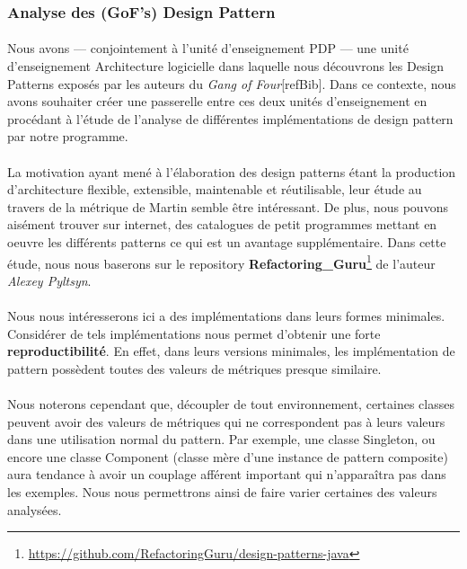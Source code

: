 \documentclass{scrartcl}
\begin{document}
    \subsubsection{Analyse des (GoF's) Design Pattern}
    \paragraph{}Nous avons --- conjointement à l'unité d'enseignement PDP --- une unité d'enseignement Architecture logicielle dans laquelle nous découvrons les Design Patterns exposés par les auteurs du \emph{Gang of Four}[refBib]. Dans ce contexte, nous avons souhaiter créer une passerelle entre ces deux unités d'enseignement en procédant à l'étude de l'analyse de différentes implémentations de design pattern par notre programme.
    
    \paragraph{}La motivation ayant mené à l'élaboration des design patterns étant la production d'architecture flexible, extensible, maintenable et réutilisable, leur étude au travers de la métrique de Martin semble être intéressant. De plus, nous pouvons aisément trouver sur internet, des catalogues de petit programmes mettant en oeuvre les différents patterns ce qui est un avantage supplémentaire. Dans cette étude, nous nous baserons sur le repository \textbf{Refactoring\_Guru}\footnote{\url{https://github.com/RefactoringGuru/design-patterns-java}} de l'auteur \emph{Alexey Pyltsyn}.
    
    \paragraph{}Nous nous intéresserons ici a des implémentations dans leurs formes minimales. Considérer de tels implémentations nous permet d'obtenir une forte \textbf{reproductibilité}. En effet, dans leurs versions minimales, les implémentation de pattern possèdent toutes des valeurs de métriques presque similaire.
    
    \paragraph{}Nous noterons cependant que, découpler de tout environnement, certaines classes peuvent avoir des valeurs de métriques qui ne correspondent pas à leurs valeurs dans une utilisation normal du pattern. Par exemple, une classe Singleton, ou encore une classe Component (classe mère d'une instance de pattern composite) aura tendance à avoir un couplage afférent important qui n’apparaîtra pas dans les exemples. Nous nous permettrons ainsi de faire varier certaines des valeurs analysées.
\end{document}
